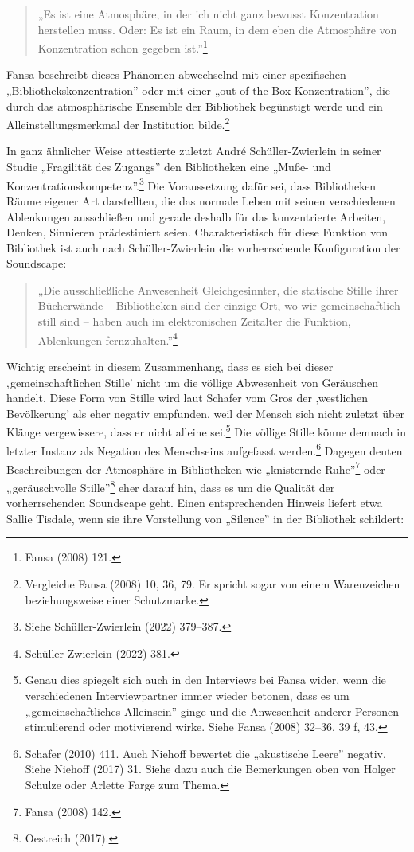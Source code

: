 \documentclass[a4paper,
fontsize=11pt,
oneside,
numbers=noperiodatend,
parskip=half-,
bibliography=totoc,
final
]{scrartcl}
\begin{document}
\begin{quote}
„Es ist eine Atmosphäre, in der ich nicht ganz bewusst Konzentration
herstellen muss. Oder: Es ist ein Raum, in dem eben die Atmosphäre von
Konzentration schon gegeben ist.''\footnote{Fansa (2008) 121.}
\end{quote}

Fansa beschreibt dieses Phänomen abwechselnd mit einer spezifischen
„Bibliothekskonzentration'' oder mit einer
„out-of-the-Box-Konzentration'', die durch das atmosphärische Ensemble
der Bibliothek begünstigt werde und ein Alleinstellungsmerkmal der
Institution bilde.\footnote{Vergleiche Fansa (2008) 10, 36, 79. Er
  spricht sogar von einem Warenzeichen beziehungsweise einer
  Schutzmarke.}

In ganz ähnlicher Weise attestierte zuletzt André Schüller-Zwierlein in
seiner Studie „Fragilität des Zugangs'' den Bibliotheken eine „Muße- und
Konzentrationskompetenz''.\footnote{Siehe Schüller-Zwierlein (2022)
  379--387.} Die Voraussetzung dafür sei, dass Bibliotheken Räume
eigener Art darstellten, die das normale Leben mit seinen verschiedenen
Ablenkungen ausschließen und gerade deshalb für das konzentrierte
Arbeiten, Denken, Sinnieren prädestiniert seien. Charakteristisch für
diese Funktion von Bibliothek ist auch nach Schüller-Zwierlein die
vorherrschende Konfiguration der Soundscape:

\begin{quote}
„Die ausschließliche Anwesenheit Gleichgesinnter, die statische Stille
ihrer Bücherwände -- Bibliotheken sind der einzige Ort, wo wir
gemeinschaftlich still sind -- haben auch im elektronischen Zeitalter
die Funktion, Ablenkungen fernzuhalten.''\footnote{Schüller-Zwierlein
  (2022) 381.}
\end{quote}

Wichtig erscheint in diesem Zusammenhang, dass es sich bei dieser
‚gemeinschaftlichen Stille' nicht um die völlige Abwesenheit von
Geräuschen handelt. Diese Form von Stille wird laut Schafer vom Gros der
‚westlichen Bevölkerung' als eher negativ empfunden, weil der Mensch
sich nicht zuletzt über Klänge vergewissere, dass er nicht alleine
sei.\footnote{Genau dies spiegelt sich auch in den Interviews bei Fansa
  wider, wenn die verschiedenen Interviewpartner immer wieder betonen,
  dass es um „gemeinschaftliches Alleinsein'' ginge und die Anwesenheit
  anderer Personen stimulierend oder motivierend wirke. Siehe Fansa
  (2008) 32--36, 39 f, 43.} Die völlige Stille könne demnach in letzter
Instanz als Negation des Menschseins aufgefasst werden.\footnote{Schafer
  (2010) 411. Auch Niehoff bewertet die „akustische Leere'' negativ.
  Siehe Niehoff (2017) 31. Siehe dazu auch die Bemerkungen oben von
  Holger Schulze oder Arlette Farge zum Thema.} Dagegen deuten
Beschreibungen der Atmosphäre in Bibliotheken wie „knisternde
Ruhe''\footnote{Fansa (2008) 142.} oder „geräuschvolle
Stille''\footnote{Oestreich (2017).} eher darauf hin, dass es um die
Qualität der vorherrschenden Soundscape geht. Einen entsprechenden
Hinweis liefert etwa Sallie Tisdale, wenn sie ihre Vorstellung von
„Silence'' in der Bibliothek schildert:
\end{document}
